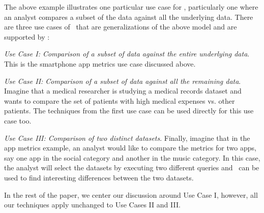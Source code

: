 The above example illustrates one particular use case for \VizRecDB,
particularly one where an analyst compares a subset of the data against all
the underlying data.
There are three use cases of \VizRecDB\ that are generalizations of the above
model and are supported by \VizRecDB:
\squishlist
  \item {\it Use Case I: Comparison of a subset of data against the entire
  underlying data}.
  This is the smartphone app metrics use case discussed above.
  \item {\it Use Case II: Comparison of a subset of data against all the
  remaining data}.
  Imagine that a medical researcher is studying a medical records dataset and
  wants to compare the set of patients with high medical expenses vs. 
  other patients. The techniques from the first use case can be used
  directly for this use case too.
  \item {\it Use Case III: Comparison of two distinct datasets}. Finally,
  imagine that in the app metrics example, an analyst would like to compare
  the metrics for two apps, say one app in the social category and another in
  the music category. In this case, the analyst will select the datasets
  by executing two different queries and \VizRecDB\ can be used to find
  interesting differences between the two datasets.
\squishend

In the rest of the paper, we center our discussion around Use Case I, however,
all our techniques apply unchanged to Use Cases II and III.


